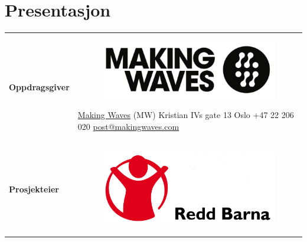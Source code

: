 \chapter{Presentasjon}
\vspace{-1.5cm}
\begin{flushleft}
\renewcommand{\arraystretch}{1.5}
\begin{tabular}[ht]{@{}lp{100mm}@{}}
\textbf{Oppdragsgiver} & 
\begin{figure}
\vspace{-0.75cm}
\hspace{-2.5cm}
\includegraphics[scale=0.15, keepaspectratio]{./img/presentasjon/mw_logo.png}
\end{figure}
\vspace{-0.5cm}
\href{http://www.makingwaves.no/}{Making Waves} (MW) \newline Kristian IVs gate 13 \newline 0164 Oslo \newline +47 22 206 020 \newline \href{mailto:post@makingwaves.com}{post@makingwaves.com} \\
\textbf{Prosjekteier} & 
\begin{figure}
\vspace{-0.75cm}
\hspace{-2.5cm}
\includegraphics[scale=0.075, keepaspectratio]{./img/presentasjon/rb_logo.jpg}
\end{figure}
\vspace{-0.5cm}

\end{tabular}
\end{flushleft}
